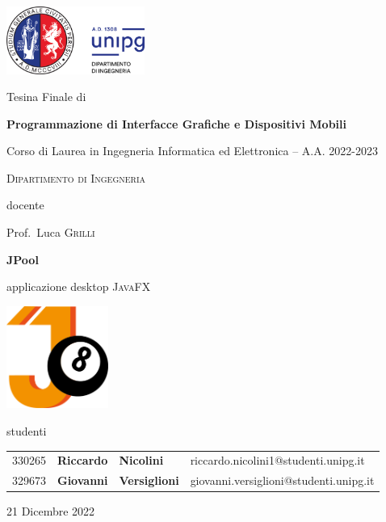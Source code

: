 \documentclass[12pt,a4paper]{report}
\begin{document}

\begin{titlepage} %

	\centering
	
	\includegraphics[width=0.34\textwidth]{logo-unipg}\par\vspace{1cm}
	
	\large{Tesina Finale di}\par
	\large{\textbf{Programmazione di Interfacce Grafiche e Dispositivi Mobili}}\par
	\small{Corso di Laurea in Ingegneria Informatica ed Elettronica -- A.A. 2022-2023}\par
	\textsc{\small{Dipartimento di Ingegneria}}\par

	\vspace{0.5cm}
	docente\par
	Prof.~Luca \textsc{Grilli}

	\vspace{1cm}
	\textbf{\huge{JPool}}\par
	\vspace{0.2cm}
	applicazione desktop \textsc{JavaFX}\par
	
	\vspace{0.5cm}
	\includegraphics[width=0.25\textwidth]{Logo.png}\par\vspace{1cm}
	
	\vspace{1cm}
	\large{studenti}\par
	\vspace{0.2cm}
	\begin{tabular}{ l l l l }
	\large{330265} & \large{\textbf{Riccardo}} & \large{\textbf{Nicolini}} & \large{riccardo.nicolini1@studenti.unipg.it}\\
	\large{329673} & \large{\textbf{Giovanni}} & \large{\textbf{Versiglioni}} & \large{giovanni.versiglioni@studenti.unipg.it}\\
	\end{tabular}

	\vfill
	\raggedright
	\small{21 Dicembre 2022}
	
\end{titlepage} %
\restoregeometry
\end{document}
